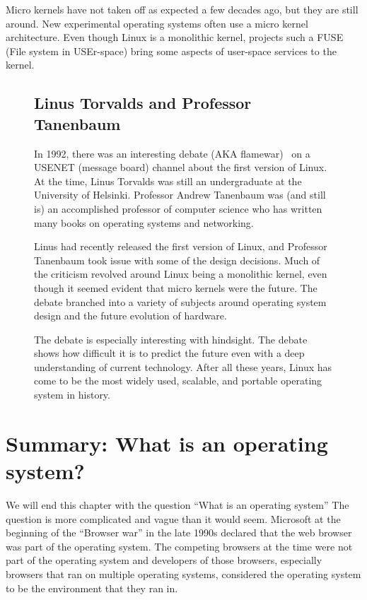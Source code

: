\documentclass{article}
\begin{document}
Micro kernels have not taken off as expected a few decades ago, but they are still around.
New experimental operating systems often use a micro kernel architecture.
Even though Linux is a monolithic kernel, projects such a FUSE (File system in USEr-space) bring some aspects of user-space services to the kernel.

\begin{figure}
\begin{boxed}
\subsection*{Linus Torvalds and Professor Tanenbaum}
In 1992, there was an interesting debate (AKA flamewar)~\cite{linux-ast} on a USENET (message board) channel about the first version of Linux.
At the time, Linus Torvalds was still an undergraduate at the University of Helsinki.
Professor Andrew Tanenbaum was (and still is) an accomplished professor of computer science who has written many books on operating systems and networking.

Linus had recently released the first version of Linux, and Professor Tanenbaum took issue with some of the design decisions.
Much of the criticism revolved around Linux being a monolithic kernel, even though it seemed evident that micro kernels were the future.
The debate branched into a variety of subjects around operating system design and the future evolution of hardware.

The debate is especially interesting with hindsight.
The debate shows how difficult it is to predict the future even with a deep understanding of current technology.
After all these years, Linux has come to be the most widely used, scalable, and portable operating system in history.
\end{boxed}
\end{figure}

\section{Summary: What is an operating system?}

We will end this chapter with the question ``What is an operating system''
The question is more complicated and vague than it would seem.
Microsoft at the beginning of the ``Browser war'' in the late 1990s declared that the web browser was part of the operating system.
The competing browsers at the time were not part of the operating system and developers of those browsers, especially browsers that ran on multiple operating systems, considered the operating system to be the environment that they ran in.
\end{document}
